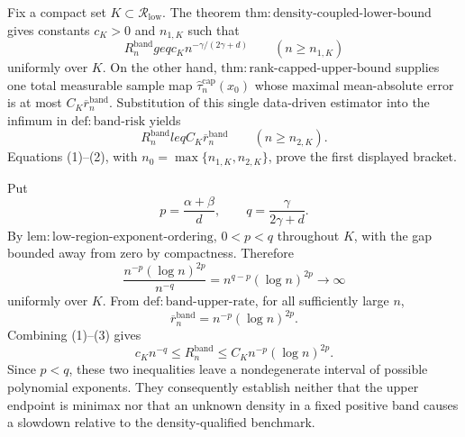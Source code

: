 Fix a compact set \(K\subset\mathcal R_{\mathrm{low}}\).  The theorem
\(\mathrm{thm:density\mbox{-}coupled\mbox{-}lower\mbox{-}bound}\) gives constants
\(c_K>0\) and \(n_{1,K}\) such that
\[
R_n^{\mathrm{band}}geq c_K n^{-\gamma/(2\gamma+d)}
\qquad(n\geq n_{1,K})
\tag{1}
\]
uniformly over \(K\).  On the other hand,
\(\mathrm{thm:rank\mbox{-}capped\mbox{-}upper\mbox{-}bound}\) supplies one total
measurable sample map \(\widehat\tau_n^{\mathrm{cap}}(x_0)\) whose maximal
mean-absolute error is at most \(C_K\overline r_n^{\mathrm{band}}\).  Substitution
of this single data-driven estimator into the infimum in
\(\mathrm{def:band\mbox{-}risk}\) yields
\[
R_n^{\mathrm{band}}leq C_K\overline r_n^{\mathrm{band}}
\qquad(n\geq n_{2,K}).
\tag{2}
\]
Equations (1)--(2), with \(n_0=\max\{n_{1,K},n_{2,K}\}\), prove the first
displayed bracket.

Put
\[
p=\frac{\alpha+\beta}{d},
\qquad q=\frac{\gamma}{2\gamma+d}.
\]
By \(\mathrm{lem:low\mbox{-}region\mbox{-}exponent\mbox{-}ordering}\),
\(0<p<q\) throughout \(K\), with the gap bounded away from zero by compactness.
Therefore
\[
\frac{n^{-p}(\log n)^{2p}}{n^{-q}}
=n^{q-p}(\log n)^{2p}\longrightarrow\infty
\]
uniformly over \(K\).  From \(\mathrm{def:band\mbox{-}upper\mbox{-}rate}\), for
all sufficiently large \(n\),
\[
\overline r_n^{\mathrm{band}}
=n^{-p}(\log n)^{2p}.
\tag{3}
\]
Combining (1)--(3) gives
\[
c_Kn^{-q}\leq R_n^{\mathrm{band}}
\leq C_Kn^{-p}(\log n)^{2p}.
\]
Since \(p<q\), these two inequalities leave a nondegenerate interval of possible
polynomial exponents.  They consequently establish neither that the upper
endpoint is minimax nor that an unknown density in a fixed positive band causes
a slowdown relative to the density-qualified benchmark.